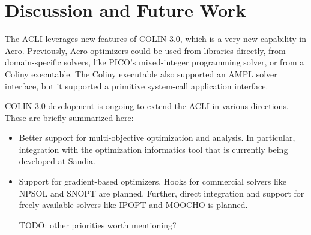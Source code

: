 \section{Discussion and Future Work}
\label{sec:conclusions}

The ACLI leverages new features of COLIN 3.0, which is a very new capability in Acro.  Previously, Acro optimizers could be used from libraries directly, from domain-specific solvers, like PICO's mixed-integer programming solver, or from a Coliny executable.  The Coliny executable also supported an AMPL solver interface, but it supported a primitive system-call application interface.

COLIN 3.0 development is ongoing to extend the ACLI in various directions.  These are briefly summarized here:
\begin{itemize}

\item Better support for multi-objective optimization and analysis.  In particular, integration with the optimization informatics tool that is currently being developed at Sandia.

\item Support for gradient-based optimizers.  Hooks for commercial solvers like NPSOL and SNOPT are planned.  Further, direct integration and support for freely available solvers like IPOPT and MOOCHO is planned.

\if 
TODO: other priorities worth mentioning?
\fi

\end{itemize}

